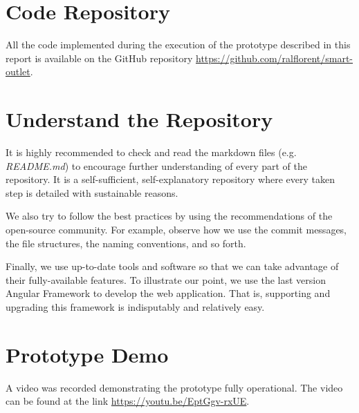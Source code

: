 %
%
%
%


\clearpage
\appendix
\begin{appendices}
    \section{Code Repository}
    \label{sec:code-repo}

    All the code implemented during the execution of the prototype described in this report is available on the GitHub repository \href{https://github.com/ralflorent/smart-outlet}{https://github.com/ralflorent/smart-outlet}.

    \section{Understand the Repository}
    It is highly recommended to check and read the markdown files (e.g. \emph{README.md}) to encourage further understanding of every part of the repository. It is a self-sufficient, self-explanatory repository where every taken step is detailed with sustainable reasons.

    We also try to follow the best practices by using the recommendations of the open-source community. For example, observe how we use the commit messages, the file structures, the naming conventions, and so forth.

    Finally, we use up-to-date tools and software so that we can take advantage
    of their fully-available features. To illustrate our point, we use the last
    version Angular Framework to develop the web application. That is,
    supporting and upgrading this framework is indisputably and relatively easy.
    
    \section{Prototype Demo}
    A video was recorded demonstrating the prototype fully operational. The
    video can be found at the link \href{https://youtu.be/EptGgv-rxUE}{https://youtu.be/EptGgv-rxUE}.


\end{appendices}
